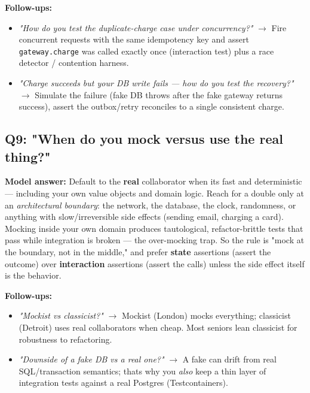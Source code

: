 \documentclass[11pt]{article}
\providecommand{\tightlist}{\setlength{\itemsep}{1pt}\setlength{\parskip}{0pt}}
\begin{document}
\textbf{Follow-ups:}

\begin{itemize}
\tightlist
\item
  \emph{"How do you test the duplicate-charge case under concurrency?"} \(\rightarrow\) Fire concurrent requests with the same idempotency key and assert \texttt{gateway.charge} was called exactly once (interaction test) plus a race detector / contention harness.
\item
  \emph{"Charge succeeds but your DB write fails --- how do you test the recovery?"} \(\rightarrow\) Simulate the failure (fake DB throws after the fake gateway returns success), assert the outbox/retry reconciles to a single consistent charge.
\end{itemize}

\subsection{Q9: "When do you mock versus use the real thing?"}\label{q9-when-do-you-mock-versus-use-the-real-thing}

\textbf{Model answer:} Default to the \textbf{real} collaborator when it\textquotesingle s fast and deterministic --- including your own value objects and domain logic. Reach for a double only at an \emph{architectural boundary}: the network, the database, the clock, randomness, or anything with slow/irreversible side effects (sending email, charging a card). Mocking inside your own domain produces tautological, refactor-brittle tests that pass while integration is broken --- the over-mocking trap. So the rule is "mock at the boundary, not in the middle," and prefer \textbf{state} assertions (assert the outcome) over \textbf{interaction} assertions (assert the calls) unless the side effect itself is the behavior.

\textbf{Follow-ups:}

\begin{itemize}
\tightlist
\item
  \emph{"Mockist vs classicist?"} \(\rightarrow\) Mockist (London) mocks everything; classicist (Detroit) uses real collaborators when cheap. Most seniors lean classicist for robustness to refactoring.
\item
  \emph{"Downside of a fake DB vs a real one?"} \(\rightarrow\) A fake can drift from real SQL/transaction semantics; that\textquotesingle s why you \emph{also} keep a thin layer of integration tests against a real Postgres (Testcontainers).
\end{itemize}
\end{document}
